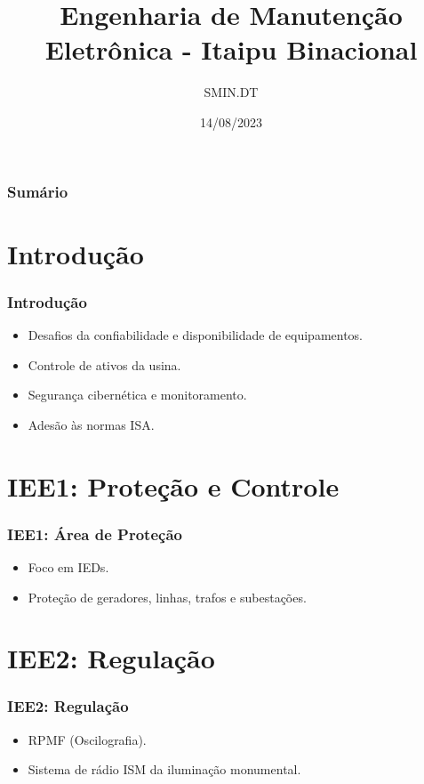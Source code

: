 \documentclass{beamer}
\title{Engenharia de Manutenção Eletrônica - Itaipu Binacional}
\author{SMIN.DT}
\date{14/08/2023}
\begin{document}
\frame{\titlepage}

\begin{frame}
\frametitle{Sumário}
\tableofcontents
\end{frame}

\section[Introdução]{Introdução}
\begin{frame}
\frametitle{Introdução}
\begin{itemize}
    \item Desafios da confiabilidade e disponibilidade de equipamentos.
    \item Controle de ativos da usina.
    \item Segurança cibernética e monitoramento.
    \item Adesão às normas ISA.
\end{itemize}
\end{frame}

\section[IEE1]{IEE1: Proteção e Controle}
\begin{frame}
\frametitle{IEE1: Área de Proteção}
\begin{itemize}
    \item Foco em IEDs.
    \item Proteção de geradores, linhas, trafos e subestações.
\end{itemize}
\end{frame}

\section[IEE2]{IEE2: Regulação}
\begin{frame}
\frametitle{IEE2: Regulação}
\begin{itemize}
    \item RPMF (Oscilografia).
    \item Sistema de rádio ISM da iluminação monumental.
\end{itemize}
\end{frame}
\end{document}
